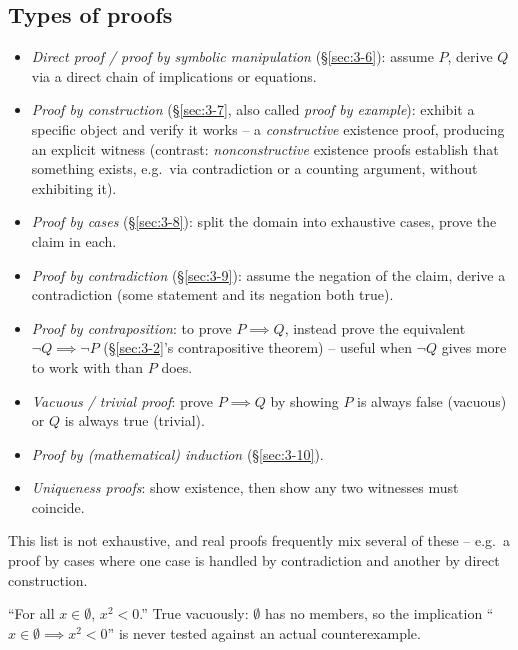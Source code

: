 \subsection{Types of proofs}
\label{sec:3-5}

\begin{note}
\begin{itemize}
    \item \emph{Direct proof / proof by symbolic manipulation} (\S\ref{sec:3-6}): assume $P$, derive $Q$ via a direct chain of implications or equations.
    \item \emph{Proof by construction} (\S\ref{sec:3-7}, also called \emph{proof by example}): exhibit a specific object and verify it works -- a \emph{constructive} existence proof, producing an explicit witness (contrast: \emph{nonconstructive} existence proofs establish that something exists, e.g.\ via contradiction or a counting argument, without exhibiting it).
    \item \emph{Proof by cases} (\S\ref{sec:3-8}): split the domain into exhaustive cases, prove the claim in each.
    \item \emph{Proof by contradiction} (\S\ref{sec:3-9}): assume the negation of the claim, derive a contradiction (some statement and its negation both true).
    \item \emph{Proof by contraposition}: to prove $P \implies Q$, instead prove the equivalent $\neg Q \implies \neg P$ (\S\ref{sec:3-2}'s contrapositive theorem) -- useful when $\neg Q$ gives more to work with than $P$ does.
    \item \emph{Vacuous / trivial proof}: prove $P \implies Q$ by showing $P$ is always false (vacuous) or $Q$ is always true (trivial).
    \item \emph{Proof by (mathematical) induction} (\S\ref{sec:3-10}).
    \item \emph{Uniqueness proofs}: show existence, then show any two witnesses must coincide.
\end{itemize}
This list is not exhaustive, and real proofs frequently mix several of these -- e.g.\ a proof by cases where one case is handled by contradiction and another by direct construction.
\end{note}

\begin{example}
``For all $x\in\emptyset$, $x^2<0$.'' True vacuously: $\emptyset$ has no members, so the implication ``$x\in\emptyset \implies x^2<0$'' is never tested against an actual counterexample.
\end{example}

